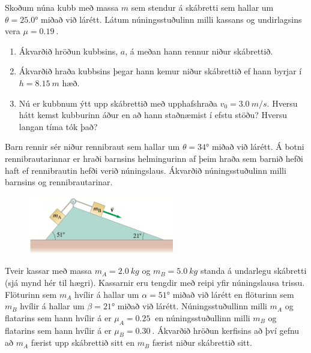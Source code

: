 \ifdefined \wholebook \else\documentclass[oneside]{book}\usepackage{EdlBook}\graphicspath{{figures/}}
\begin{document}
\begin{enumerate}[label = \textbf{Dæmi \thechapter.\arabic*.}]
\item Skoðum núna kubb með massa $m$ sem stendur á skábretti sem hallar um $\theta = \ang{25.0}$ miðað við lárétt. Látum núningsstuðulinn milli kassans og undirlagsins vera $\mu = \SI{0.19}{}$.
\begin{enumerate}[label = \textbf{(\alph*)}]
    \item Ákvarðið hröðun kubbsins, $a$, á meðan hann rennur niður skábrettið.
    
    \item Ákvarðið hraða kubbsins þegar hann kemur niður skábrettið ef hann byrjar í $h = \SI{8.15}{m}$ hæð.
    
    \item Nú er kubbnum ýtt upp skábrettið með upphafshraða $v_0 = \SI{3.0}{m/s}$. Hversu hátt kemst kubburinn áður en að hann staðnæmist  í efstu stöðu? Hversu langan tíma tók það?
\end{enumerate}


\item Barn rennir sér niður rennibraut sem hallar um $\theta = \ang{34}$ miðað við lárétt. Á botni rennibrautarinnar er hraði barnsins helmingurinn af þeim hraða sem barnið hefði haft ef rennibrautin hefði verið núningslaus. Ákvarðið núningsstuðulinn milli barnsins og rennibrautarinar.

\vspace{0.3cm}

\begin{minipage}{\linewidth}
\begin{figure}
\vspace{0.5cm}
\includegraphics[width=2.5in]{images/skabr4.png}
\end{figure}

\item Tveir kassar með massa $m_A = \SI{2.0}{kg}$ og $m_B = \SI{5.0}{kg}$ standa á undarlegu skábretti (sjá mynd hér til hægri). Kassarnir eru tengdir með reipi yfir núningslausa trissu. Flöturinn sem $m_A$ hvílir á hallar um $\alpha = \ang{51}$ miðað við lárétt en flöturinn sem $m_B$ hvílir á hallar um $\beta = \ang{21}$ miðað við lárétt. Núningsstuðullinn milli $m_A$ og flatarins sem hann hvílir á er $\mu_A = \SI{0.25}{}$ en núningsstuðullinn milli $m_B$ og flatarins sem hann hvílir á er $\mu_B = \SI{0.30}{}$. Ákvarðið hröðun kerfisins að því gefnu að $m_A$ færist upp skábrettið sitt en $m_B$ færist niður skábrettið sitt.
\end{minipage}


\end{enumerate}
\end{document}
